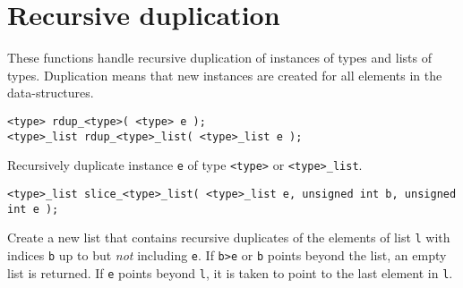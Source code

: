 \section{Recursive duplication}
These functions handle recursive duplication of instances of types and
lists of types.
Duplication means that new instances are created for all elements
in the data-structures.
\begin{verbatim}
<type> rdup_<type>( <type> e );
<type>_list rdup_<type>_list( <type>_list e );
\end{verbatim}
\begin{desc}
Recursively duplicate instance {\tt e} of type {\tt <type>} or
{\tt <type>\_list}.
\end{desc}
\begin{verbatim}
<type>_list slice_<type>_list( <type>_list e, unsigned int b, unsigned int e );
\end{verbatim}
\begin{desc}
Create a new list that contains recursive duplicates of the elements of
list {\tt l} with indices {\tt b} up to but {\em not} including {\tt e}.
If {\tt b>e} or {\tt b} points beyond the list,
an empty list is returned.
If {\tt e} points beyond {\tt l},
it is taken to point to the last element in {\tt l}.
\end{desc}

